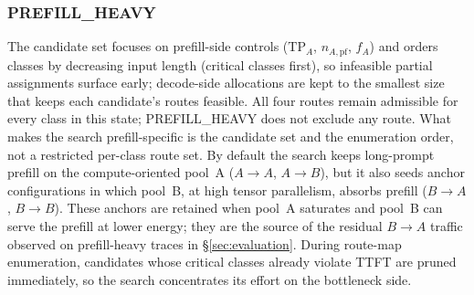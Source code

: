 \subsubsection*{\textnormal{ PREFILL\_HEAVY}}
The candidate set focuses on prefill-side controls ($\mathrm{TP}_A$, $n_{A,\mathrm{pf}}$, $f_A$) and orders classes by decreasing input length (critical classes first), so infeasible partial assignments surface early; decode-side allocations are kept to the smallest size that keeps each candidate's routes feasible.
All four routes remain admissible for every class in this state; PREFILL\_HEAVY does not exclude any route.
What makes the search prefill-specific is the candidate set and the enumeration order, not a restricted per-class route set.
By default the search keeps long-prompt prefill on the compute-oriented pool~A ($A{\to}A$, $A{\to}B$), but it also seeds anchor configurations in which pool~B, at high tensor parallelism, absorbs prefill ($B{\to}A$, $B{\to}B$).
These anchors are retained when pool~A saturates and pool~B can serve the prefill at lower energy; they are the source of the residual $B{\to}A$ traffic observed on prefill-heavy traces in \S\ref{sec:evaluation}.
During route-map enumeration, candidates whose critical classes already violate TTFT are pruned immediately, so the search concentrates its effort on the bottleneck side.

